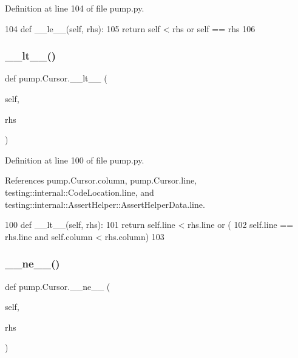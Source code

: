 Definition at line 104 of file pump.\+py.


\begin{DoxyCode}
104   \textcolor{keyword}{def }\_\_le\_\_(self, rhs):
105     \textcolor{keywordflow}{return} self < rhs \textcolor{keywordflow}{or} self == rhs
106 
\end{DoxyCode}
\mbox{\label{classpump_1_1Cursor_a4f846e3cf80aa45853b1fb7a03863745}} 
\subsubsection{\texorpdfstring{\+\_\+\+\_\+lt\+\_\+\+\_\+()}{\_\_lt\_\_()}}
{\footnotesize\ttfamily def pump.\+Cursor.\+\_\+\+\_\+lt\+\_\+\+\_\+ (\begin{DoxyParamCaption}\item[{}]{self,  }\item[{}]{rhs }\end{DoxyParamCaption})}



Definition at line 100 of file pump.\+py.



References pump.\+Cursor.\+column, pump.\+Cursor.\+line, testing\+::internal\+::\+Code\+Location.\+line, and testing\+::internal\+::\+Assert\+Helper\+::\+Assert\+Helper\+Data.\+line.


\begin{DoxyCode}
100   \textcolor{keyword}{def }\_\_lt\_\_(self, rhs):
101     \textcolor{keywordflow}{return} self.line < rhs.line \textcolor{keywordflow}{or} (
102         self.line == rhs.line \textcolor{keywordflow}{and} self.column < rhs.column)
103 
\end{DoxyCode}
\mbox{\label{classpump_1_1Cursor_a7bcfe24fa4e5df6ed12f627b8d3b3ba3}} 
\subsubsection{\texorpdfstring{\+\_\+\+\_\+ne\+\_\+\+\_\+()}{\_\_ne\_\_()}}
{\footnotesize\ttfamily def pump.\+Cursor.\+\_\+\+\_\+ne\+\_\+\+\_\+ (\begin{DoxyParamCaption}\item[{}]{self,  }\item[{}]{rhs }\end{DoxyParamCaption})}



